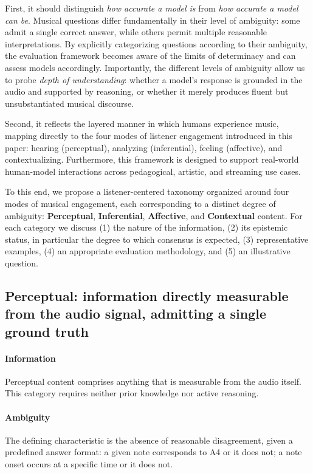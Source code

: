 \documentclass[conference,a4paper]{APSIPA2026}
\begin{document}
First, it should distinguish \emph{how accurate a model is} from \emph{how accurate a model can be}. Musical questions differ fundamentally in their level of ambiguity: some admit a single correct answer, while others permit multiple reasonable interpretations. By explicitly categorizing questions according to their ambiguity, the evaluation framework becomes aware of the limits of determinacy and can assess models accordingly. Importantly, the different levels of ambiguity allow us to probe \emph{depth of understanding}: whether a model’s response is grounded in the audio and supported by reasoning, or whether it merely produces fluent but unsubstantiated musical discourse.

Second, it reflects the layered manner in which humans experience music, mapping directly to the four modes of listener engagement introduced in this paper: hearing (perceptual), analyzing (inferential), feeling (affective), and contextualizing. Furthermore, this framework is designed to support real-world human-model interactions across pedagogical, artistic, and streaming use cases.


To this end, we propose a listener-centered taxonomy organized around four modes of musical engagement, each corresponding to a distinct degree of ambiguity: \textbf{Perceptual}, \textbf{Inferential}, \textbf{Affective}, and \textbf{Contextual} content. For each category we discuss
(1) the nature of the information, (2) its epistemic status, in particular the degree to which consensus is expected, (3) representative examples, (4) an appropriate evaluation methodology, and (5) an illustrative question. 




\subsection{\textbf{Perceptual}: information directly measurable from the audio signal, admitting a single ground truth}

\paragraph{Information}
Perceptual content comprises anything that is measurable from the audio itself. This category requires neither prior knowledge nor active reasoning.

\paragraph{Ambiguity}
The defining characteristic is the absence of reasonable disagreement, given a predefined answer format: a given note corresponds to A4 or it does not; a note onset occurs at a specific time or it does not.
\end{document}
